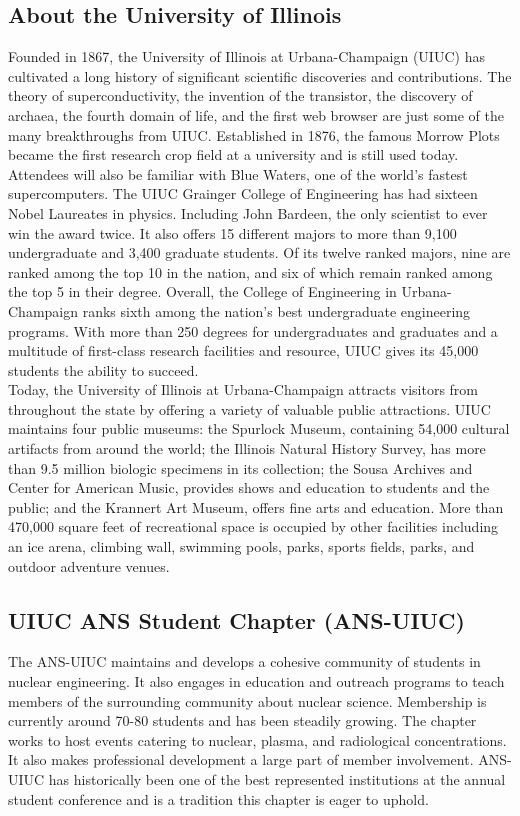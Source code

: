 \documentclass[12pt, letterpaper]{article}
\begin{document}
\subsection*{About the University of Illinois}
Founded in 1867, the University of Illinois at Urbana-Champaign (UIUC) has cultivated a long history of significant scientific discoveries and contributions. The theory of superconductivity, the invention of the transistor, the discovery of archaea, the fourth domain of life, and the first web browser are just some of the many breakthroughs from UIUC. Established in 1876, the famous Morrow Plots became the first research crop field at a university and is still used today. Attendees will also be familiar with Blue Waters, one of the world’s fastest supercomputers. 
The UIUC Grainger College of Engineering has had sixteen Nobel Laureates in physics. Including John Bardeen, the only scientist to ever win the award twice. It also offers 15 different majors to more than 9,100 undergraduate and 3,400 graduate students. Of its twelve ranked majors, nine are ranked among the top 10 in the nation, and six of which remain ranked among the top 5 in their degree. Overall, the College of Engineering in Urbana-Champaign ranks sixth among the nation’s best undergraduate engineering programs. With more than 250 degrees for undergraduates and graduates and a multitude of first-class research facilities and resource, UIUC gives its 45,000 students the ability to succeed.\\
Today, the University of Illinois at Urbana-Champaign attracts visitors from throughout the state by offering a variety of valuable public attractions. UIUC maintains four public museums: the Spurlock Museum, containing 54,000 cultural artifacts from around the world; the Illinois Natural History Survey, has more than 9.5 million biologic specimens in its collection; the Sousa Archives and Center for American Music, provides shows and education to students and the public; and the Krannert Art Museum, offers fine arts and education. More than 470,000 square feet of recreational space is occupied by other facilities including an ice arena, climbing wall, swimming pools, parks, sports fields, parks, and outdoor adventure venues. 

\subsection*{UIUC ANS Student Chapter (ANS-UIUC)}
The ANS-UIUC maintains and develops a cohesive community of students in nuclear engineering. It also engages in education and outreach programs to teach members of the surrounding community about nuclear science. Membership is currently around 70-80 students and has been steadily growing. The chapter works to host events catering to nuclear, plasma, and radiological concentrations. It also makes professional development a large part of member involvement. ANS-UIUC has historically been one of the best represented institutions at the annual student conference and is a tradition this chapter is eager to uphold. 
\end{document}
